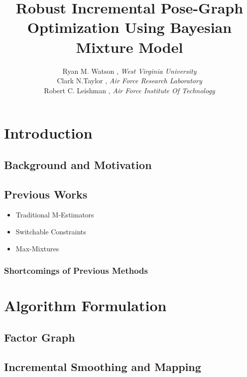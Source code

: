\documentclass[ugly]{ion}
\begin{document}
\title{Robust Incremental Pose-Graph Optimization Using Bayesian Mixture Model \\ }
\author{Ryan M. Watson , { \it West Virginia University} \\   
		Clark N.Taylor , {\it Air Force Research Laboratory} \\ 
	    Robert C. Leishman , {\it Air Force Institute Of Technology} }
\maketitle


\begin{abstract}
 
\end{abstract}

\section{Introduction}
\subsection{Background and Motivation}


\subsection{Previous Works}

	\begin{itemize}
		\item Traditional M-Estimators
		\item Switchable Constraints
		\item Max-Mixtures
	\end{itemize}

\subsubsection{Shortcomings of Previous Methods}

 
\section{Algorithm Formulation}
	\subsection{Factor Graph}
	\subsection{Incremental Smoothing and Mapping}
\end{document}
